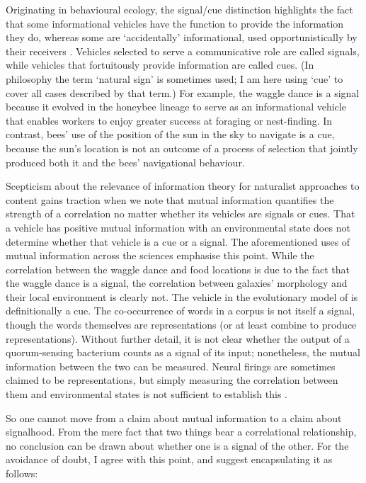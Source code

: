 Originating in behavioural ecology, the signal/cue distinction highlights the fact that some informational vehicles have the function to provide the information they do, whereas some are `accidentally' informational, used opportunistically by their receivers \citep[$\S$1.2]{maynardsmith2003animal}.
Vehicles selected to serve a communicative role are called signals, while vehicles that fortuitously provide information are called cues.
(In philosophy the term `natural sign' is sometimes used; I am here using `cue' to cover all cases described by that term.)
For example, the waggle dance is a signal because it evolved in the honeybee lineage to serve as an informational vehicle that enables workers to enjoy greater success at foraging or nest-finding.
In contrast, bees' use of the position of the sun in the sky to navigate is a cue, because the sun's location is not an outcome of a process of selection that jointly produced both it and the bees' navigational behaviour.

Scepticism about the relevance of information theory for naturalist approaches to content gains traction when we note that mutual information quantifies the strength of a correlation no matter whether its vehicles are signals or cues.
That a vehicle has positive mutual information with an environmental state does not determine whether that vehicle is a cue or a signal.
The aforementioned uses of mutual information across the sciences emphasise this point.
While the correlation between the waggle dance and food locations is due to the fact that the waggle dance is a signal, the correlation between galaxies' morphology and their local environment is clearly not.
The vehicle in the evolutionary model of \citet{donaldson-matasci2010fitness} is definitionally a cue.
The co-occurrence of words in a corpus is not itself a signal, though the words themselves are representations (or at least combine to produce representations).
Without further detail, it is not clear whether the output of a quorum-sensing bacterium counts as a signal of its input; nonetheless, the mutual information between the two can be measured.
Neural firings are sometimes claimed to be representations, but simply measuring the correlation between them and environmental states is not sufficient to establish this \citep{rathkopf2017neural}.

So one cannot move from a claim about mutual information to a claim about signalhood.
From the mere fact that two things bear a correlational relationship, no conclusion can be drawn about whether one is a signal of the other.
For the avoidance of doubt, I agree with this point, and suggest encapsulating it as follows:

